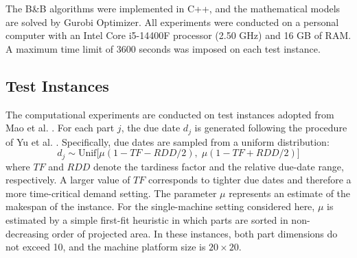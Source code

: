 \documentclass[letterpaper, 10 pt, conference]{ieeeconf}  %
\begin{document}
The B\&B algorithms were implemented in C++, and the mathematical models are solved by Gurobi Optimizer. All experiments were conducted on a personal computer with an Intel Core i5-14400F processor (2.50 GHz) and 16 GB of RAM. A maximum time limit of 3600 seconds was imposed on each test instance.



\subsection{Test Instances}
The computational experiments are conducted on test instances adopted from Mao et al. \cite{maoCombinatorialBendersDecomposition2024}. For each part $j$, the due date $d_j$ is generated following the procedure of Yu et al. \cite{yuMathematicalModelsMinimizing2022}. Specifically, due dates are sampled from a uniform distribution:
\begin{equation}
    d_j \sim \text{Unif} \big[ \mu(1 - TF - RDD/2), \; \mu(1 - TF + RDD/2) \big]
\end{equation}
where $TF$ and $RDD$ denote the tardiness factor and the relative due-date range, respectively. A larger value of $TF$ corresponds to tighter due dates and therefore a more time-critical demand setting. The parameter $\mu$ represents an estimate of the makespan of the instance. For the single-machine setting considered here, $\mu$ is estimated by a simple first-fit heuristic in which parts are sorted in non-decreasing order of projected area. In these instances, both part dimensions do not exceed 10, and the machine platform size is $20 \times 20$.
\end{document}
